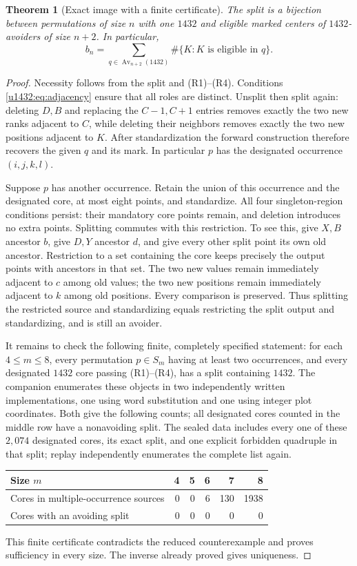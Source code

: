 \documentclass[11pt]{article}
\newtheorem{theorem}{Theorem}[section]
\theoremstyle{remark}\newtheorem{remark}[theorem]{Remark}
\newcommand{\Av}{\operatorname{Av}}
\begin{document}
\begin{theorem}[Exact image with a finite certificate]\label{u1432:thm:image}
The split is a bijection between permutations of size $n$ with one
$1432$ and eligible marked centers of $1432$-avoiders of size $n+2$.
In particular,
\[
 b_n=\sum_{q\in\Av_{n+2}(1432)}
             \#\{K:K\text{ is eligible in }q\}.
\]
\end{theorem}
\begin{proof}
Necessity follows from the split and (R1)--(R4). Conditions
\eqref{u1432:eq:adjacency} ensure that all roles are distinct. Unsplit then
split again: deleting $D,B$ and replacing the $C-1,C+1$ entries removes
exactly the two new ranks adjacent to $C$, while deleting their neighbors
removes exactly the two new positions adjacent to $K$. After
standardization the forward construction therefore recovers the given
$q$ and its mark. In particular $p$ has the designated occurrence
$(i,j,k,l)$.

Suppose $p$ has another occurrence. Retain the union of this occurrence
and the designated core, at most eight points, and standardize.
All four singleton-region conditions persist: their mandatory core points
remain, and deletion introduces no extra points. Splitting commutes with
this restriction. To see this, give $X,B$ ancestor $b$, give $D,Y$
ancestor $d$, and give every other split point its own old ancestor.
Restriction to a set containing the core keeps precisely the output
points with ancestors in that set. The two new values remain immediately
adjacent to $c$ among old values; the two new positions remain immediately
adjacent to $k$ among old positions. Every comparison is preserved.
Thus splitting the restricted source and standardizing equals restricting
the split output and standardizing, and is still an avoider.

It remains to check the following finite, completely specified statement:
for each $4\le m\le8$, every permutation $p\in S_m$ having at least two
occurrences, and every designated $1432$ core passing (R1)--(R4), has a
split containing $1432$. The companion enumerates these objects in two
independently written implementations, one using word substitution and
one using integer plot coordinates. Both give the following counts;
all designated cores counted in the middle row have a nonavoiding split.
The sealed data includes every one of these $2{,}074$ designated cores,
its exact split, and one explicit forbidden quadruple in that split;
replay independently enumerates the complete list again.
\begin{center}
\begin{tabular}{lrrrrr}\toprule
Size $m$&4&5&6&7&8\\\midrule
Cores in multiple-occurrence sources&0&0&6&130&1938\\
Cores with an avoiding split&0&0&0&0&0\\\bottomrule
\end{tabular}
\end{center}
This finite certificate contradicts the reduced counterexample and
proves sufficiency in every size. The inverse already proved gives
uniqueness.
\end{proof}
\end{document}
